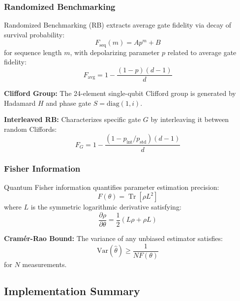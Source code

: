 \documentclass[11pt,a4paper]{article}
\theoremstyle{definition}
\theoremstyle{remark}
\renewcommand{\Tr}{\operatorname{Tr}}
\begin{document}
\subsubsection{Randomized Benchmarking}

Randomized Benchmarking (RB) extracts average gate fidelity via decay of survival probability:
\begin{equation}
F_{\text{seq}}(m) = A p^m + B
\end{equation}
for sequence length $m$, with depolarizing parameter $p$ related to average gate fidelity:
\begin{equation}
F_{\text{avg}} = 1 - \frac{(1-p)(d-1)}{d}
\end{equation}

\textbf{Clifford Group:} The 24-element single-qubit Clifford group is generated by Hadamard $H$ and phase gate $S = \text{diag}(1, i)$.

\textbf{Interleaved RB:} Characterizes specific gate $G$ by interleaving it between random Cliffords:
\begin{equation}
F_G = 1 - \frac{(1 - p_{\text{int}}/p_{\text{std}})(d-1)}{d}
\end{equation}

\subsubsection{Fisher Information}

Quantum Fisher information quantifies parameter estimation precision:
\begin{equation}
F(\theta) = \Tr[\rho L^2]
\end{equation}
where $L$ is the symmetric logarithmic derivative satisfying:
\begin{equation}
\frac{\partial\rho}{\partial\theta} = \frac{1}{2}(L\rho + \rho L)
\end{equation}

\textbf{Cramér-Rao Bound:} The variance of any unbiased estimator satisfies:
\begin{equation}
\text{Var}(\hat{\theta}) \geq \frac{1}{NF(\theta)}
\end{equation}
for $N$ measurements.

\subsection{Implementation Summary}
\end{document}
